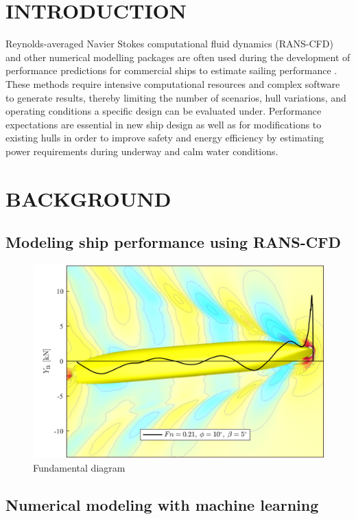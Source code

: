 \documentclass[10pt,a4paper,twocolumn]{article}
\begin{document}
\section{INTRODUCTION}
Reynolds-averaged Navier Stokes computational fluid dynamics (RANS-CFD) and other numerical modelling packages are often used during the development of performance predictions for commercial ships to estimate sailing performance \cite{Tezdogan2015}. These methods require intensive computational resources and complex software to generate results, thereby limiting the number of scenarios, hull variations, and operating conditions a specific design can be evaluated under. Performance expectations are essential in new ship design as well as for modifications to existing hulls in order to improve safety and energy efficiency   by estimating power requirements during underway and calm water conditions.

\section{BACKGROUND}

\subsection{Modeling ship performance using RANS-CFD}

\begin{figure}[]
\centering
\includegraphics[width=\columnwidth]{images/hull1.png}  %
\caption{Fundamental diagram }
\label{fig:hull1}
\end{figure}

\subsection{Numerical modeling with machine learning}
\end{document}
